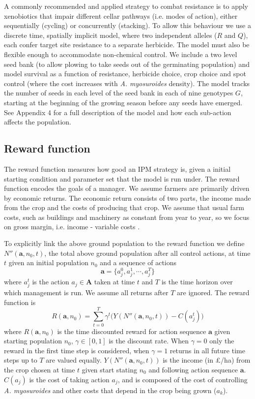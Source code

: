 \documentclass[12pt, a4paper]{article}
\begin{document}
A commonly recommended \citep{REX2013} and applied \citep{Hick2018} strategy to combat resistance is to apply xenobiotics that impair different cellar pathways (i.e. modes of action), either sequentially (cycling) or concurrently (stacking). To allow this behaviour we use a discrete time, spatially implicit model, where two independent alleles ($R$ and $Q$), each confer target site resistance to a separate herbicide. The model must also be flexible enough to accommodate non-chemical control. We include a two level seed bank (to allow plowing to take seeds out of the germinating population) and model survival as a function of resistance, herbicide choice, crop choice and spot control (where the cost increases with \textit{A. myosuroides} density). The model tracks the number of seeds in each level of the seed bank in each of nine genotypes $G$, starting at the beginning of the growing season before any seeds have emerged. See Appendix 4 for a full description of the model and how each sub-action affects the population. 

\subsection*{Reward function}
The reward function measures how good an IPM strategy is, given a initial starting condition and parameter set that the model is run under. The reward function encodes the goals of a manager. We assume farmers are primarily driven by economic returns. The economic return consists of two parts, the income made from the crop and the costs of producing that crop. We assume that usual farm costs, such as buildings and machinery as constant from year to year, so we focus on gross margin, i.e. income - variable costs \citep[pp.~3--4]{Nix2016}. 

To explicitly link the above ground population to the reward function we define $N''(\mathbf{a}, n_0, t)$, the total above ground population after all control actions, at time $t$ given an initial population $n_0$ and a sequence of actions 
\begin{equation}
	\mathbf{a} = \{a_j^0, a_j^1, \cdots, a_j^T\}
\end{equation}	  
where $a_j^t$ is the action $a_j \in \mathbf{A}$ taken at time $t$ and $T$ is the time horizon over which management is run. We assume all returns after $T$ are ignored. The reward function is  
\begin{equation}
	R(\mathbf{a}, n_0) = \sum_{t=0}^T \gamma^t \Big( Y(N''(\mathbf{a}, n_0, t)) - C(a_j^t) \Big)
\end{equation}
where $R(\mathbf{a}, n_0)$ is the time discounted reward for action sequence $\mathbf{a}$ given starting population $n_0$, $\gamma \in [0, 1]$ is the discount rate. When $\gamma = 0$ only the reward in the first time step is considered, when $\gamma = 1$ returns in all future time steps up to $T$ are valued equally. $Y(N''(\mathbf{a}, n_0, t))$ is the income (in \pounds /ha) from the crop chosen at time $t$ given start stating $n_0$ and following action sequence $\mathbf{a}$. $C(a_j)$ is the cost of taking action $a_j$, and is composed of the cost of controlling \textit{A. myosuroides} and other costs that depend in the crop being grown ($a_k$).   
\end{document}
